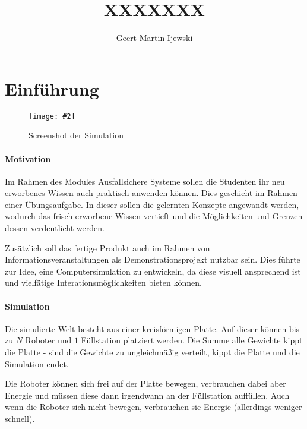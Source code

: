 \documentclass[
    12pt,
    bibliography=totoc,
    ngerman,
	enabledeprecatedfontcommands
]{scrartcl}
\title{XXXXXXX}
\author{Geert Martin Ijewski}
\newcommand{\includevisio}[2][]{\texttt{[image: \#2]}}
\begin{document}
\maketitle
{}
\thispagestyle{empty}

\clearpage
\tableofcontents
\listoffigures
\listoftables

\clearpage
\section{Einf{\"{u}}hrung}
\begin{figure}
	\centering
	\includevisio[width=\textwidth]{simulation}
	\caption{Screenshot der Simulation}
	\label{fig:simulation}
\end{figure}

\paragraph{Motivation} Im Rahmen des Modules Ausfallsichere Systeme sollen die Studenten ihr neu erworbenes Wissen auch praktisch anwenden k{\"{o}}nnen. Dies geschieht im Rahmen einer {\"{U}}bungsaufgabe. In dieser sollen die gelernten Konzepte angewandt werden, wodurch das frisch erworbene Wissen vertieft und die M{\"{o}}glichkeiten und Grenzen dessen verdeutlicht werden.

Zus{\"{a}}tzlich soll das fertige Produkt auch im Rahmen von Informationsveranstaltungen als Demonstrationsprojekt nutzbar sein.
Dies f{\"{u}}hrte zur Idee, eine Computersimulation zu entwickeln, da diese visuell ansprechend ist und vielf{\"{a}}tige
Interationsm{\"{o}}glichkeiten bieten k{\"{o}}nnen.

\paragraph{Simulation} Die simulierte Welt besteht aus einer kreisf{\"{o}}rmigen Platte. Auf dieser k{\"{o}}nnen bis zu $N$ Roboter und $1$ F{\"{u}}llstation
platziert werden. Die Summe alle Gewichte kippt die Platte - sind die Gewichte zu ungleichm{\"{a}}{\ss}ig verteilt, kippt
die Platte und die Simulation endet.

Die Roboter k{\"{o}}nnen sich frei auf der Platte bewegen, verbrauchen dabei aber Energie und m{\"{u}}ssen diese dann irgendwann
an der F{\"{u}}llstation auff{\"{u}}llen. Auch wenn die Roboter sich nicht bewegen, verbrauchen sie Energie (allerdings weniger
schnell).
\end{document}
